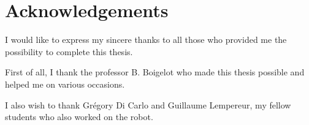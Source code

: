 \clearpage
{}
\setcounter{page}{1}
\chapter*{Acknowledgements}
	I would like to express my sincere thanks to all those who provided me the possibility to complete this thesis.

First of all, I thank the professor B. Boigelot who made this thesis possible and helped me on various occasions.

I also wish to thank Grégory Di Carlo and Guillaume Lempereur, my fellow students who also worked on the robot.